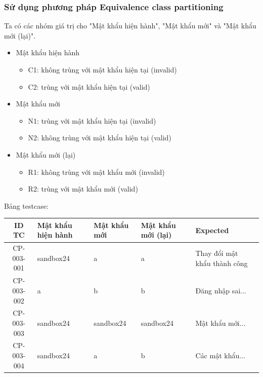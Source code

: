 \documentclass[a4paper, 12pt]{article}
\begin{document}
\subsubsection{Sử dụng phương pháp Equivalence class partitioning}
Ta có các nhóm giá trị cho "Mật khẩu hiện hành", "Mật khẩu mới" và "Mật khẩu mới (lại)".
\begin{itemize}
    \item Mật khẩu hiện hành
    \begin{itemize}
        \item C1: không trùng với mật khẩu hiện tại (invalid)
        \item C2: trùng với mật khẩu hiện tại (valid)
    \end{itemize}
    \item Mật khẩu mới
    \begin{itemize}
        \item N1: trùng với mật khẩu hiện tại (invalid)
        \item N2: không trùng với mật khẩu hiện tại (valid)
    \end{itemize}
    \item Mật khẩu mới (lại)
    \begin{itemize}
        \item R1: không trùng với mật khẩu mới (invalid)
        \item R2: trùng với mật khẩu mới (valid)
    \end{itemize}
\end{itemize}
Bảng testcase:
\begin{table}[H]
    \centering
    \begin{tabular}{|c|p{2cm}|p{2cm}|p{2cm}|p{4cm}|}
        \hline
        ID TC & Mật khẩu hiện hành & Mật khẩu mới & Mật khẩu mới (lại) & Expected \\
        \hline
        CP-003-001 & sandbox24 & a & a & Thay đổi mật khẩu thành công \\
        \hline
        CP-003-002 & a & b & b & Đăng nhập sai...\\
        \hline
        CP-003-003 & sandbox24 & sandbox24 & sandbox24 & Mật khẩu mới... \\
        \hline
        CP-003-004 & sandbox24 & a & b & Các mật khẩu...\\
        \hline
    \end{tabular}
    \label{tab:my_label}
\end{table}
\end{document}
